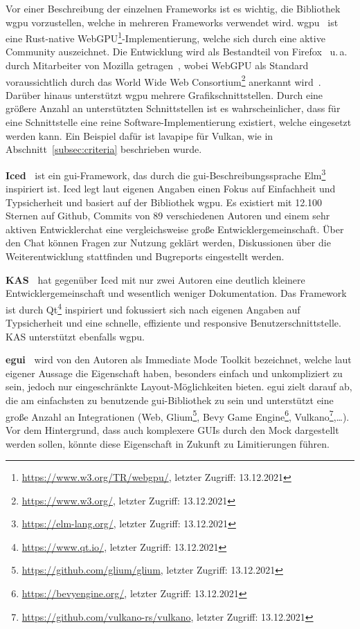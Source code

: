 Vor einer Beschreibung der einzelnen Frameworks ist es wichtig, die Bibliothek \mbox{wgpu} vorzustellen, welche in mehreren Frameworks verwendet wird. wgpu~\cite{GfxrsWgpu2018} ist eine Rust-native WebGPU\footnote{\url{https://www.w3.org/TR/webgpu/}, letzter Zugriff: 13.12.2021}-Implementierung, welche sich durch eine aktive Community auszeichnet. Die Entwicklung wird als Bestandteil von Firefox~\cite{GpuwebGpuwebImplementation2017} u.\,a. durch Mitarbeiter von Mozilla getragen~\cite{GfxrsWgpuPulse2018}, wobei WebGPU als Standard voraussichtlich durch das World Wide Web Consortium\footnote{\url{https://www.w3.org/}, letzter Zugriff: 13.12.2021} anerkannt wird~\cite{WebGPU}. Darüber hinaus unterstützt wgpu mehrere Grafikschnittstellen. Durch eine größere Anzahl an unterstützten Schnittstellen ist es wahrscheinlicher, dass für eine Schnittstelle eine reine Software-Implementierung existiert, welche eingesetzt werden kann. Ein Beispiel dafür ist lavapipe für Vulkan, wie in Abschnitt~\ref{subsec:criteria} beschrieben wurde.

\textbf{Iced~\cite{ramonHecrjIced2019}} ist ein \gls{gui}-Framework, das durch die \gls{gui}-Beschreibungssprache Elm\footnote{\url{https://elm-lang.org/}, letzter Zugriff: 13.12.2021} inspiriert ist. Iced legt laut eigenen Angaben einen Fokus auf Einfachheit und Typsicherheit und basiert auf der Bibliothek wgpu. Es existiert mit 12.100 Sternen auf Github, Commits von 89 verschiedenen Autoren \cite{ramonHecrjIced2019} und einem sehr aktiven Entwicklerchat \cite{IcedZulip} eine vergleichsweise große Entwicklergemeinschaft. Über den Chat können Fragen zur Nutzung geklärt werden, Diskussionen über die Weiterentwicklung stattfinden und Bugreports eingestellt werden.

\textbf{KAS~\cite{KasguiKas2019}} hat gegenüber Iced mit nur zwei Autoren eine deutlich kleinere Entwicklergemeinschaft und wesentlich weniger Dokumentation.
Das Framework ist durch Qt\footnote{\url{https://www.qt.io/}, letzter Zugriff: 13.12.2021} inspiriert und fokussiert sich nach eigenen Angaben auf Typsicherheit und eine schnelle, effiziente und responsive Benutzerschnittstelle. KAS unterstützt ebenfalls wgpu.

\textbf{egui~\cite{ernerfeldtEmilkEgui2019}} wird von den Autoren als Immediate Mode Toolkit bezeichnet, welche laut eigener Aussage die Eigenschaft haben, besonders einfach und unkompliziert zu sein, jedoch nur eingeschränkte Layout-Möglichkeiten bieten. egui zielt darauf ab, die am einfachsten zu benutzende \gls{gui}-Bibliothek zu sein und unterstützt eine große Anzahl an Integrationen (Web, Glium\footnote{\label{footn:glium}\url{https://github.com/glium/glium}, letzter Zugriff: 13.12.2021}, Bevy Game Engine\footnote{\url{https://bevyengine.org/}, letzter Zugriff: 13.12.2021}, Vulkano\footnote{\label{footn:vulkano}\url{https://github.com/vulkano-rs/vulkano}, letzter Zugriff: 13.12.2021},\dots). Vor dem Hintergrund, dass auch komplexere GUIs durch den Mock dargestellt werden sollen, könnte diese Eigenschaft in Zukunft zu Limitierungen führen.

